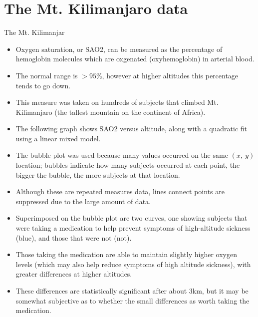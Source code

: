 \documentclass[
  9pt,
  ignorenonframetext,
]{beamer}
\begin{document}
\hypertarget{the-mt.-kilimanjaro-data}{%
\section{The Mt. Kilimanjaro data}\label{the-mt.-kilimanjaro-data}}

\begin{frame}{The Mt. Kilimanjar}
\protect\hypertarget{the-mt.-kilimanjar}{}
\begin{itemize}
\item
  Oxygen saturation, or SAO2, can be measured as the percentage of
  hemoglobin molecules which are oxgenated (oxyhemoglobin) in arterial
  blood.
\item
  The normal range is \(> 95\%\), however at higher altitudes this
  percentage tends to go down.
\item
  This measure was taken on hundreds of subjects that climbed Mt.
  Kilimanjaro (the tallest mountain on the continent of Africa).
\item
  The following graph shows SAO2 versus altitude, along with a quadratic
  fit using a linear mixed model.
\item
  The bubble plot was used because many values occurred on the same
  \((x,\ y)\) location; bubbles indicate how many subjects occurred at
  each point, the bigger the bubble, the more subjects at that location.
\end{itemize}
\end{frame}

\begin{frame}{}
\protect\hypertarget{section-9}{}
\begin{itemize}
\item
  Although these are repeated measures data, lines connect points are
  suppressed due to the large amount of data.
\item
  Superimposed on the bubble plot are two curves, one showing subjects
  that were taking a medication to help prevent symptoms of
  high-altitude sickness (blue), and those that were not (not).
\item
  Those taking the medication are able to maintain slightly higher
  oxygen levels (which may also help reduce symptoms of high altitude
  sickness), with greater differences at higher altitudes.
\item
  These differences are statistically significant after about 3km, but
  it may be somewhat subjective as to whether the small differences as
  worth taking the medication.
\end{itemize}
\end{frame}
\end{document}

